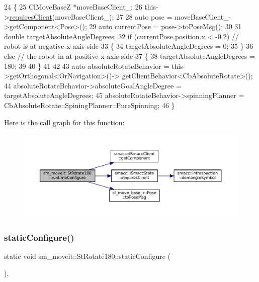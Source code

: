 \begin{DoxyCode}
24     \{
25         ClMoveBaseZ *moveBaseClient\_;
26         this->\hyperlink{classsmacc_1_1ISmaccState_a7f95c9f0a6ea2d6f18d1aec0519de4ac}{requiresClient}(moveBaseClient\_);
27 
28         \textcolor{keyword}{auto} pose = moveBaseClient\_->getComponent<Pose>();
29         \textcolor{keyword}{auto} currentPose = pose->toPoseMsg();
30 
31         \textcolor{keywordtype}{double} targetAbsoluteAngleDegrees;
32         \textcolor{keywordflow}{if} (currentPose.position.x < -0.2) \textcolor{comment}{// robot is at negative x-axis side}
33         \{
34                 targetAbsoluteAngleDegrees = 0;
35         \}
36         \textcolor{keywordflow}{else} \textcolor{comment}{// the robot in at positive x-axis side}
37         \{
38                 targetAbsoluteAngleDegrees = 180;
39              
40         \}
41 
42         
43         \textcolor{keyword}{auto} absoluteRotateBehavior = this->getOrthogonal<OrNavigation>()->
      getClientBehavior<CbAbsoluteRotate>();
44         absoluteRotateBehavior->absoluteGoalAngleDegree = targetAbsoluteAngleDegrees;
45         absoluteRotateBehavior->spinningPlanner = CbAbsoluteRotate::SpiningPlanner::PureSpinning;
46     \}
\end{DoxyCode}
Here is the call graph for this function\+:
\nopagebreak
\begin{figure}[H]
\begin{center}
\leavevmode
\includegraphics[width=350pt]{structsm__moveit_1_1StRotate180_af424dc219c107d5c3678c6fc915d9c68_cgraph}
\end{center}
\end{figure}
\mbox{\label{structsm__moveit_1_1StRotate180_a7ce91eeeb1a8740e1a6f797a41dc940a}} 
\subsubsection{\texorpdfstring{static\+Configure()}{staticConfigure()}}
{\footnotesize\ttfamily static void sm\+\_\+moveit\+::\+St\+Rotate180\+::static\+Configure (\begin{DoxyParamCaption}{ }\end{DoxyParamCaption})\hspace{0.3cm}{\ttfamily [inline]}, {\ttfamily [static]}}



